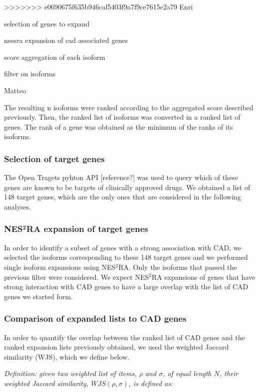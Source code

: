 \documentclass[fleqn,10pt]{SelfArx} %
\begin{document}
>>>>>>> e0690675f635b946caf5403f9a7f9ce7615e2a79
Enri

selection of genes to expand

nessra expansion of cad associated genes

score aggregation of each isoform

filter on isoforms

Matteo

The resulting n isoforms were ranked according to the aggregated score described previously. Then, the ranked list of isoforms was converted in a ranked list of genes. The rank of a gene was obtained as the minimum of the ranks of its isoforms.

\subsubsection{Selection of target genes}

The Open Tragets pyhton API [reference?] was used to query which of these genes are known to be targets of clinically approved drugs. We obtained a list of 148 target genes, which are the only ones that are considered in the following analyses.

\subsubsection{NES$^{\textbf{2}}$RA expansion of target genes}

In order to identify a subset of genes with a strong association with CAD, we selected the isoforms corresponding to these 148 target genes and we performed single isoform expansions using NES$^2$RA. Only the isoforms that passed the previous filter were considered. We expect NES$^2$RA expansions of genes that have strong interaction with CAD genes to have a large overlap with the list of CAD genes we started form.

\subsubsection{Comparison of expanded lists to CAD genes}

In order to quantify the overlap between the ranked list of CAD genes and the ranked expansion lists previously obtained, we used the weighted Jaccard similarity (WJS), which we define below.\medskip

\noindent
\textit{Definition: given two weighted list of items, $\rho$ and $\sigma$, of equal length $N$, their weighted Jaccard similarity, $WJS(\rho, \sigma)$, is defined as:}
\end{document}
